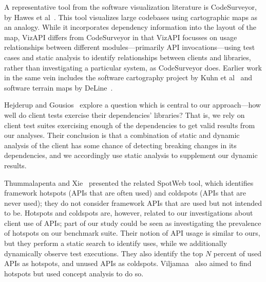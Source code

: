 \label{sec:related-work}
A representative tool from the software visualization literature is
CodeSurveyor, by Hawes et al~\cite{hawes15:_codes}. This tool visualizes large
codebases using cartographic maps as an analogy.  While it
incorporates dependency information into the layout of the map, VizAPI
differs from CodeSurveyor in that VizAPI focusses on usage relationships
between different modules---primarily API invocations---using test
cases and static analysis to identify relationships between clients and libraries, rather
than investigating a particular system, as CodeSurveyor does.  Earlier
work in the same vein includes the software cartography project by Kuhn et
al~\cite{kuhn10:_softw} and software terrain maps by DeLine~\cite{deline05:_stayin}.




Hejderup and Gousios~\cite{DBLP:journals/jss/HejderupG22} explore a
question which is central to our approach---how well do client tests
exercise their dependencies' libraries? That is, we rely on
client test suites exercising enough of the dependencies to get valid
results from our analyses. Their conclusion is that a combination of
static and dynamic analysis of the client has some chance of detecting
breaking changes in its dependencies, and we accordingly use static
analysis to supplement our dynamic results.

Thummalapenta and Xie~\cite{thummalapenta08:_spotw} presented the
related SpotWeb tool, which identifies framework hotspots (APIs that
are often used) and coldspots (APIs that are never used); they do not
consider framework APIs that are used but not intended to be. Hotspots
and coldspots are, however, related to our investigations about client
use of APIs; part of our study could be seen as investigating the
prevalence of hotspots on our benchmark suite. Their notion of API
usage is similar to ours, but they perform a static search to identify
uses, while we additionally dynamically observe test executions. They
also identify the top $N$ percent of used APIs as hotspots, and unused
APIs as
coldspots. Viljamaa~\cite{viljamaa03:_rever_engin_framew_reuse_inter}
also aimed to find hotspots but used concept analysis to do so.

